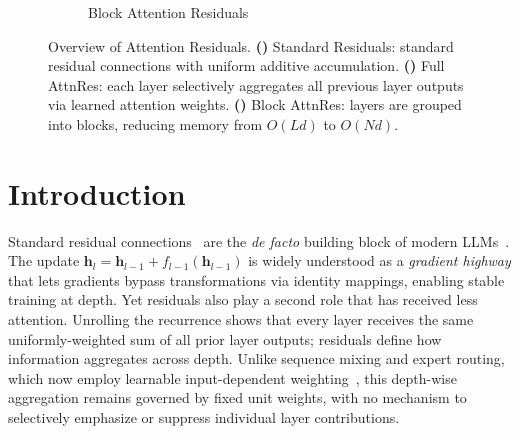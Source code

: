 \begin{figure}[b!]
\begin{subfigure}[b]{0.38\textwidth}
{%
    }
    \caption{Block Attention Residuals}
    \label{fig:teaser-block}
  \end{subfigure}

  \caption{
    Overview of Attention Residuals.
    \textbf{()} Standard Residuals: standard residual connections with uniform additive accumulation.
    \textbf{()} Full AttnRes: each layer selectively aggregates all previous layer outputs via learned attention weights.
    \textbf{()} Block AttnRes: layers are grouped into blocks, reducing memory from $O(Ld)$ to $O(Nd)$.
  }
  \label{fig:teaser}
\end{figure}





\newpage
\section{Introduction}

Standard residual connections~\cite{he2015resnet} are the \emph{de facto} building block of modern LLMs~\cite{openai-2024-gpt4,touvron-2023-llama,deepseekaiv3}. The update $\bm{h}_l = \bm{h}_{l-1} + f_{l-1}(\bm{h}_{l-1})$ is widely understood as a \textit{gradient highway} that lets gradients bypass transformations via identity mappings, enabling stable training at depth. Yet residuals also play a second role that has received less attention. Unrolling the recurrence shows that every layer receives the same uniformly-weighted sum of all prior layer outputs; residuals define how information aggregates across depth. Unlike sequence mixing and expert routing, which now employ learnable input-dependent weighting~\cite{transformer,adaptive,deepseekaiv3}, this depth-wise aggregation remains governed by fixed unit weights, with no mechanism to selectively emphasize or suppress individual layer contributions.


